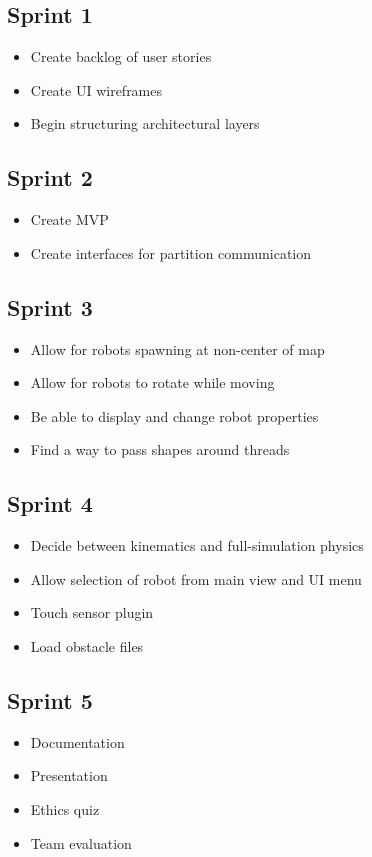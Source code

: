 \subsection{Sprint 1}
\begin{itemize}
	\item Create backlog of user stories
	\item Create UI wireframes
 	\item Begin structuring architectural layers
\end{itemize}

\subsection{Sprint 2}
\begin{itemize}
	\item Create MVP
	\item Create interfaces for partition communication 
\end{itemize}

\subsection{Sprint 3}
\begin{itemize}
	\item Allow for robots spawning at non-center of map
	\item Allow for robots to rotate while moving
 	\item Be able to display and change robot properties
 	\item Find a way to pass shapes around threads
\end{itemize}

\subsection{Sprint 4}
\begin{itemize}
	\item Decide between kinematics and full-simulation physics
	\item Allow selection of robot from main view and UI menu
	\item Touch sensor plugin
 	\item Load obstacle files
\end{itemize}

\subsection{Sprint 5}
\begin{itemize}
	\item Documentation
	\item Presentation
 	\item Ethics quiz
 	\item Team evaluation
\end{itemize}

